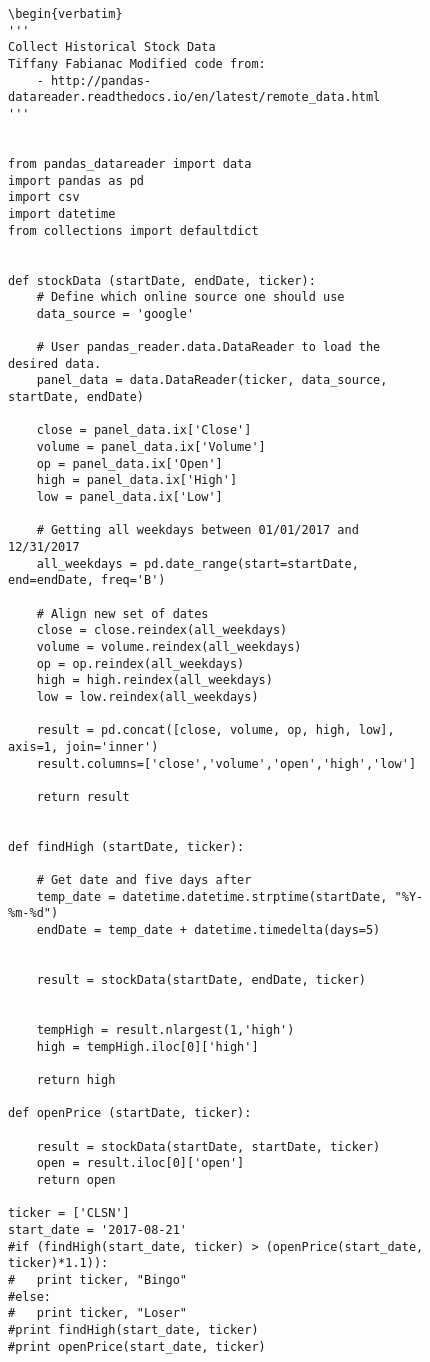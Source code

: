 \documentclass[sigconf]{acmart}
\begin{document}
\begin{figure}[htb]
\begin{lstlisting}
\begin{verbatim}
'''
Collect Historical Stock Data
Tiffany Fabianac Modified code from:
    - http://pandas-datareader.readthedocs.io/en/latest/remote_data.html
'''


from pandas_datareader import data
import pandas as pd
import csv
import datetime
from collections import defaultdict


def stockData (startDate, endDate, ticker):
	# Define which online source one should use
	data_source = 'google'

	# User pandas_reader.data.DataReader to load the desired data.
	panel_data = data.DataReader(ticker, data_source, startDate, endDate)

	close = panel_data.ix['Close']
	volume = panel_data.ix['Volume']
	op = panel_data.ix['Open']
	high = panel_data.ix['High']
	low = panel_data.ix['Low']

	# Getting all weekdays between 01/01/2017 and 12/31/2017
	all_weekdays = pd.date_range(start=startDate, end=endDate, freq='B')

	# Align new set of dates
	close = close.reindex(all_weekdays)
	volume = volume.reindex(all_weekdays)
	op = op.reindex(all_weekdays)
	high = high.reindex(all_weekdays)
	low = low.reindex(all_weekdays)

	result = pd.concat([close, volume, op, high, low], axis=1, join='inner')
	result.columns=['close','volume','open','high','low']

	return result
	
    
def findHigh (startDate, ticker):

	# Get date and five days after
	temp_date = datetime.datetime.strptime(startDate, "%Y-%m-%d")
	endDate = temp_date + datetime.timedelta(days=5)

	
	result = stockData(startDate, endDate, ticker)


	tempHigh = result.nlargest(1,'high')
	high = tempHigh.iloc[0]['high']

	return high

def openPrice (startDate, ticker):
	
	result = stockData(startDate, startDate, ticker)
	open = result.iloc[0]['open']
	return open

ticker = ['CLSN']
start_date = '2017-08-21'
#if (findHigh(start_date, ticker) > (openPrice(start_date, ticker)*1.1)):
#	print ticker, "Bingo"
#else:
#	print ticker, "Loser"
#print findHigh(start_date, ticker)
#print openPrice(start_date, ticker)


\end{lstlisting}
\end{figure}
\end{document}
